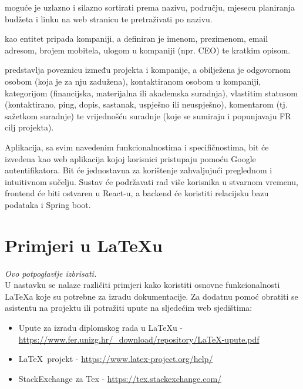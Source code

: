 		{ moguće je uzlazno i silazno sortirati prema nazivu, području, mjesecu planiranja budžeta i linku na web stranicu te pretraživati po nazivu.}\vspace{0.1cm}

		{ kao entitet pripada kompaniji, a definiran je imenom, prezimenom, email adresom, brojem mobitela, ulogom u kompaniji (npr. CEO) te kratkim opisom.}\vspace{0.1cm}

		{ predstavlja poveznicu između projekta i kompanije, a obilježena je odgovornom osobom (koja je za nju zadužena), kontaktiranom osobom u kompaniji, kategorijom (financijska, materijalna ili akademska suradnja), vlastitim statusom (kontaktirano, ping, dopis, sastanak, uspješno ili neuspješno), komentarom (tj. sažetkom suradnje) te vrijednošću suradnje (koje se sumiraju i popunjavaju FR cilj projekta).}\vspace{0.3cm}

		{Aplikacija, sa svim navedenim funkcionalnostima i specifičnostima, bit će izvedena kao web aplikacija kojoj korisnici pristupaju pomoću Google autentifikatora. Bit će jednostavna za korištenje zahvaljujući preglednom i intuitivnom sučelju. Sustav će podržavati rad više korisnika u stvarnom vremenu, frontend će biti ostvaren u React-u, a backend će koristiti relacijsku bazu podataka i Spring boot.}

		\eject

\iffalse %

		\section{Primjeri u \LaTeX u}
		
		\textit{Ovo potpoglavlje izbrisati.}\\

		U nastavku se nalaze različiti primjeri kako koristiti osnovne funkcionalnosti \LaTeX a koje su potrebne za izradu dokumentacije. Za dodatnu pomoć obratiti se asistentu na projektu ili potražiti upute na sljedećim web sjedištima:
		\begin{itemize}
			\item Upute za izradu diplomskog rada u \LaTeX u - \url{https://www.fer.unizg.hr/_download/repository/LaTeX-upute.pdf}
			\item \LaTeX\ projekt - \url{https://www.latex-project.org/help/}
			\item StackExchange za Tex - \url{https://tex.stackexchange.com/}\\
		
		\end{itemize} 	

